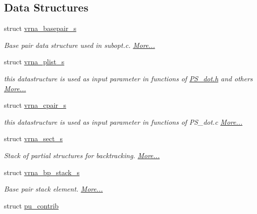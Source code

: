 \subsection*{Data Structures}
\begin{DoxyCompactItemize}
\item 
struct \hyperlink{group__data__structures_structvrna__basepair__s}{vrna\-\_\-basepair\-\_\-s}
\begin{DoxyCompactList}\small\item\em Base pair data structure used in subopt.\-c.  \hyperlink{group__data__structures_structvrna__basepair__s}{More...}\end{DoxyCompactList}\item 
struct \hyperlink{group__data__structures_structvrna__plist__s}{vrna\-\_\-plist\-\_\-s}
\begin{DoxyCompactList}\small\item\em this datastructure is used as input parameter in functions of \hyperlink{PS__dot_8h}{P\-S\-\_\-dot.\-h} and others  \hyperlink{group__data__structures_structvrna__plist__s}{More...}\end{DoxyCompactList}\item 
struct \hyperlink{group__data__structures_structvrna__cpair__s}{vrna\-\_\-cpair\-\_\-s}
\begin{DoxyCompactList}\small\item\em this datastructure is used as input parameter in functions of P\-S\-\_\-dot.\-c  \hyperlink{group__data__structures_structvrna__cpair__s}{More...}\end{DoxyCompactList}\item 
struct \hyperlink{group__data__structures_structvrna__sect__s}{vrna\-\_\-sect\-\_\-s}
\begin{DoxyCompactList}\small\item\em Stack of partial structures for backtracking.  \hyperlink{group__data__structures_structvrna__sect__s}{More...}\end{DoxyCompactList}\item 
struct \hyperlink{group__data__structures_structvrna__bp__stack__s}{vrna\-\_\-bp\-\_\-stack\-\_\-s}
\begin{DoxyCompactList}\small\item\em Base pair stack element.  \hyperlink{group__data__structures_structvrna__bp__stack__s}{More...}\end{DoxyCompactList}\item 
struct \hyperlink{group__data__structures_structpu__contrib}{pu\-\_\-contrib}

\end{DoxyCompactItemize}
